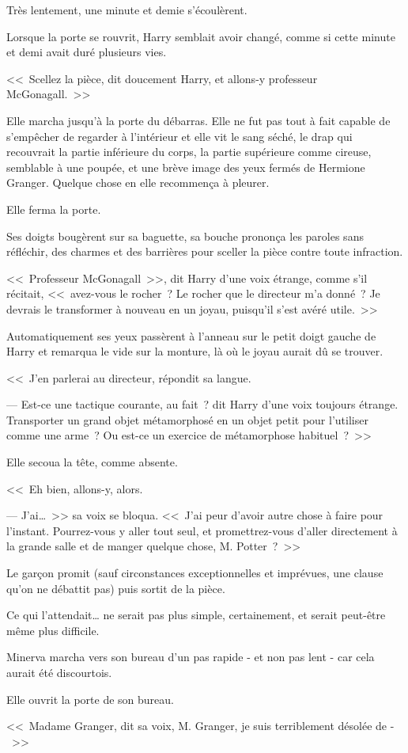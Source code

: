 Très lentement, une minute et demie s'écoulèrent.

\later

Lorsque la porte se rouvrit, Harry semblait avoir changé, comme si cette minute et demi avait duré plusieurs vies.

<<~Scellez la pièce, dit doucement Harry, et allons-y professeur McGonagall.~>>

Elle marcha jusqu'à la porte du débarras. Elle ne fut pas tout à fait capable de s'empêcher de regarder à l'intérieur et elle vit le sang séché, le drap qui recouvrait la partie inférieure du corps, la partie supérieure comme cireuse, semblable à une poupée, et une brève image des yeux fermés de Hermione Granger. Quelque chose en elle recommença à pleurer.

Elle ferma la porte.

Ses doigts bougèrent sur sa baguette, sa bouche prononça les paroles sans réfléchir, des charmes et des barrières pour sceller la pièce contre toute infraction.

<<~Professeur McGonagall~>>, dit Harry d'une voix étrange, comme s'il récitait, <<~avez-vous le rocher~? Le rocher que le directeur m'a donné~? Je devrais le transformer à nouveau en un joyau, puisqu'il s'est avéré utile.~>>

Automatiquement ses yeux passèrent à l'anneau sur le petit doigt gauche de Harry et remarqua le vide sur la monture, là où le joyau aurait dû se trouver.

<<~J'en parlerai au directeur, répondit sa langue.

--- Est-ce une tactique courante, au fait~? dit Harry d'une voix toujours étrange. Transporter un grand objet métamorphosé en un objet petit pour l'utiliser comme une arme~? Ou est-ce un exercice de métamorphose habituel~?~>>

Elle secoua la tête, comme absente.

<<~Eh bien, allons-y, alors.

--- J'ai…~>> sa voix se bloqua. <<~J'ai peur d'avoir autre chose à faire pour l'instant. Pourrez-vous y aller tout seul, et promettrez-vous d'aller directement à la grande salle et de manger quelque chose, M. Potter~?~>>

Le garçon promit (sauf circonstances exceptionnelles et imprévues, une clause qu'on ne débattit pas) puis sortit de la pièce.

Ce qui l'attendait… ne serait pas plus simple, certainement, et serait peut-être même plus difficile.

\later

Minerva marcha vers son bureau d'un pas rapide - et non pas lent - car cela aurait été discourtois.

Elle ouvrit la porte de son bureau.

<<~Madame Granger, dit sa voix, M. Granger, je suis terriblement désolée de -~>> 
